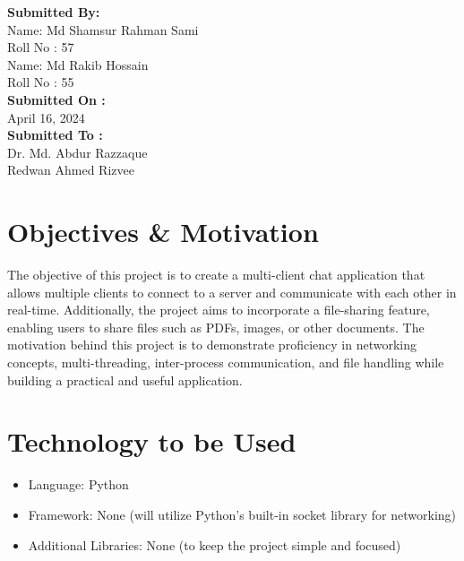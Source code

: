 \documentclass[11pt]{article}
\begin{document}
\begin{titlepage}
\begin{center}
\begin{Large}
        \end{Large}
    \end{center}     
    \begin{large}
        \textbf{Submitted By:\\[5pt]}
            Name: Md Shamsur Rahman Sami\\[5pt]
            Roll No : 57\\[7pt]
            Name: Md Rakib Hossain\\[5pt]
            Roll No : 55\\[12pt]
        \textbf{Submitted On : \\[5pt]}
            April 16, 2024\\[20pt]
        \textbf{Submitted To :\\[8pt]}
            Dr. Md. Abdur Razzaque\\
            Redwan Ahmed Rizvee
    \end{large}
\end{titlepage}


\tableofcontents  
\newpage


\section{Objectives \& Motivation}
The objective of this project is to create a multi-client chat application that allows multiple clients to connect to a server and communicate with each other in real-time. Additionally, the project aims to incorporate a file-sharing feature, enabling users to share files such as PDFs, images, or other documents. The motivation behind this project is to demonstrate proficiency in networking concepts, multi-threading, inter-process communication, and file handling while building a practical and useful application.

\section{Technology to be Used}
\begin{itemize}
    \item Language: Python
    \item Framework: None (will utilize Python's built-in socket library for networking)
    \item Additional Libraries: None (to keep the project simple and focused)
\end{itemize}
\end{document}
